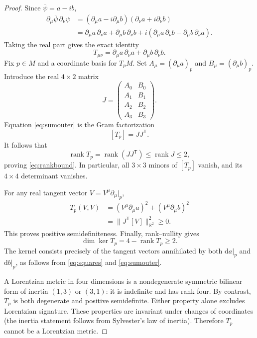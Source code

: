 \documentclass[11pt]{article}
\theoremstyle{remark}
\newcommand{\rank}{\operatorname{rank}}
\newcommand{\dd}{\mathrm{d}}
\begin{document}
\begin{proof}
Since $\overline{\psi}=a-ib$,
\begin{align}
 \partial_\mu\overline{\psi}\,\partial_\nu\psi
 &= (\partial_\mu a-i\partial_\mu b)
    (\partial_\nu a+i\partial_\nu b)\\
 &= \partial_\mu a\,\partial_\nu a
  + \partial_\mu b\,\partial_\nu b
  + i(\partial_\mu a\,\partial_\nu b
      -\partial_\mu b\,\partial_\nu a).
\end{align}
Taking the real part gives the exact identity
\begin{equation}\label{eq:sumouter}
  T_{\mu\nu}=\partial_\mu a\,\partial_\nu a
                +\partial_\mu b\,\partial_\nu b.
\end{equation}
Fix $p\in M$ and a coordinate basis for $T_pM$.  Set
$A_\mu=(\partial_\mu a)_p$ and $B_\mu=(\partial_\mu b)_p$.
Introduce the real $4\times 2$ matrix
\begin{equation}
  J=\begin{pmatrix}
   A_0&B_0\\ A_1&B_1\\ A_2&B_2\\ A_3&B_3
  \end{pmatrix}.
\end{equation}
Equation \eqref{eq:sumouter} is the Gram factorization
\begin{equation}\label{eq:gram}
  [T_p]=JJ^{\mathsf T}.
\end{equation}
It follows that
\begin{equation}
 \rank T_p=\rank(JJ^{\mathsf T})\leq \rank J\leq 2,
\end{equation}
proving \eqref{eq:rankbound}.  In particular, all $3\times3$
minors of $[T_p]$ vanish, and its $4\times4$ determinant vanishes.

For any real tangent vector $V=V^\mu\partial_\mu|_p$,
\begin{align}\label{eq:squares}
 T_p(V,V)
 &= (V^\mu\partial_\mu a)^2
   +(V^\mu\partial_\mu b)^2\\
 &=\|J^{\mathsf T}[V]\|_{\mathbb R^2}^2\geq 0.
\end{align}
This proves positive semidefiniteness.  Finally, rank--nullity
gives
\begin{equation}
 \dim\ker T_p=4-\rank T_p\geq 2.
\end{equation}
The kernel consists precisely of the tangent vectors annihilated by
both $\dd a|_p$ and $\dd b|_p$, as follows from
\eqref{eq:squares} and \eqref{eq:sumouter}.

A Lorentzian metric in four dimensions is a nondegenerate symmetric
bilinear form of inertia $(1,3)$ or $(3,1)$: it is indefinite and
has rank four.  By contrast, $T_p$ is both degenerate and positive
semidefinite.  Either property alone excludes Lorentzian signature.
These properties are invariant under changes of coordinates
(the inertia statement follows from Sylvester's law of inertia).
Therefore $T_p$ cannot be a Lorentzian metric.
\end{proof}
\end{document}
